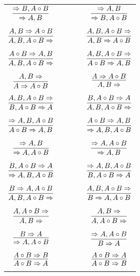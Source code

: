 \documentclass[11pt]{article}
\begin{document}
\begin{center}
\begin{tabular}{ccc}
$\infer{\Rightarrow A, B}{\Rightarrow B, A\circ B}$ && $\infer{\Rightarrow B, A\circ B}{\Rightarrow A, B}$ \\
&&\\
$\infer{A, B, A\circ B\Rightarrow }{A, B\Rightarrow A\circ B}$ && $\infer{A, B\Rightarrow A\circ B}{A, B, A\circ B\Rightarrow }$ \\
&& \\
$\infer{A, B, A\circ B\Rightarrow }{A\circ B\Rightarrow A, B}$ && $\infer{A\circ B\Rightarrow A, B}{A, B, A\circ B\Rightarrow }$ \\
&& \\
$\infer{A\Rightarrow A\circ B}{A, B\Rightarrow }$ && $\infer{A, B\Rightarrow }{A\Rightarrow A\circ B}$ \\
&& \\
$\infer{B, A\circ B\Rightarrow A}{A, B, A\circ B\Rightarrow }$ && $\infer{A, B, A\circ B\Rightarrow }{B, A\circ B\Rightarrow A}$ \\
&& \\
$\infer{A\circ B\Rightarrow A, B}{\Rightarrow A, B, A\circ B}$ & \ \ \ \ & $\infer{\Rightarrow A, B, A\circ B}{A\circ B\Rightarrow A, B}$ \\
&& \\
$\infer{\Rightarrow A, A\circ B}{\Rightarrow A, B}$ && $\infer{\Rightarrow A, B}{\Rightarrow A, A\circ B}$ \\
&& \\
$\infer{\Rightarrow A, B, A\circ B}{B, A\circ B\Rightarrow A}$ & \ \ \ \ & $\infer{B, A\circ B\Rightarrow A}{\Rightarrow A, B, A\circ B}$ \\
&& \\
$\infer{A, B, A\circ B\Rightarrow }{B\Rightarrow A, A\circ B}$ && $\infer{B\Rightarrow A, A\circ B}{A, B, A\circ B\Rightarrow }$ \\
&& \\
$\infer{A, B\Rightarrow }{A, A\circ B\Rightarrow }$ && $\infer{A, A\circ B\Rightarrow }{A, B\Rightarrow }$ \\
&& \\
$\infer{\Rightarrow A, A\circ B}{B\Rightarrow A}$ && $\infer{B\Rightarrow A}{\Rightarrow A, A\circ B}$ \\
&& \\
$\infer{A\circ B\Rightarrow A}{A\circ B\Rightarrow B}$ && $\infer{A\circ B\Rightarrow B}{A\circ B\Rightarrow A}$ \\
&& \\

\end{tabular}
\end{center}
\end{document}
